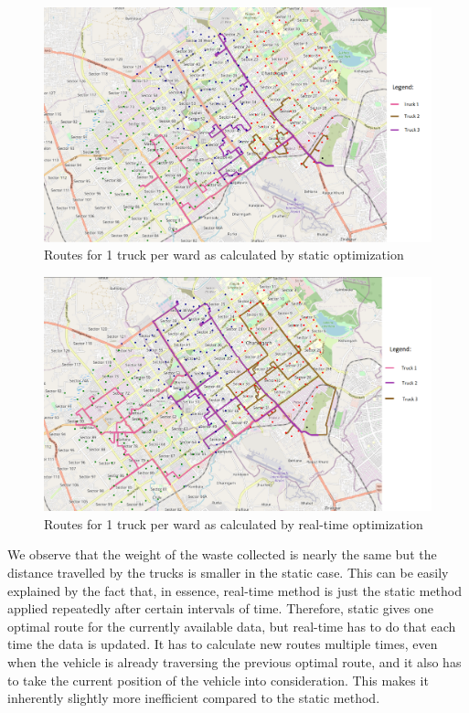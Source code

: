 \documentclass[12pt]{article}
\begin{document}
\begin{figure}[H]
    \centering
    \includegraphics[scale=0.4]{Static1truck.png}
    \caption{Routes for 1 truck per ward as calculated by static optimization}\label{fig4}
\end{figure}
\begin{figure}[H]
    \centering
    \includegraphics[scale=0.4]{Dynamic1truck.png}
    \caption{Routes for 1 truck per ward as calculated by real-time optimization}\label{fig5}
\end{figure}
We observe that the weight of the waste collected is nearly the same but the distance travelled by the trucks is smaller in the static case. This can be easily explained by the fact that, in essence, real-time method is just the static method applied repeatedly after certain intervals of time. Therefore, static gives one optimal route for the currently available data, but real-time has to do that each time the data is updated. It has to calculate new routes multiple times, even when the vehicle is already traversing the previous optimal route, and it also has to take the current position of the vehicle into consideration. This makes it inherently slightly more inefficient compared to the static method. 
\end{document}

